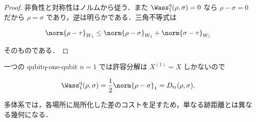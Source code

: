 \begin{proof}
  非負性と対称性はノルムから従う．また
  $\Wass_1^{\rm q}(\rho,\sigma)=0$ なら
  $\rho-\sigma=0$ だから $\rho=\sigma$ であり，逆は明らかである．三角不等式は

  \[
    \norm{\rho-\tau}_{W_1}
    \leq\norm{\rho-\sigma}_{W_1}+\norm{\sigma-\tau}_{W_1}
  \]

  そのものである．
\end{proof}

\begin{example}{一つの qubit}{q-one-qubit}
  $n=1$ では許容分解は $X^{(1)}=X$ しかないので

  \[
    \Wass_1^{\rm q}(\rho,\sigma)=\frac12\norm{\rho-\sigma}_1
    =D_{\rm tr}(\rho,\sigma).
  \]

  多体系では，各場所に局所化した差のコストを足すため，単なる跡距離とは異なる幾何になる．
\end{example}
